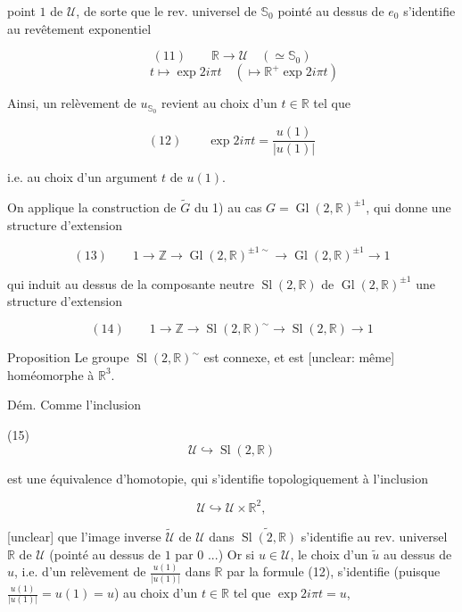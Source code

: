 point $1$ de $\mathcal{U}$, de sorte que le rev. 
universel de $\mathbb{S}_0$ pointé au dessus de 
$e_0$ s'identifie au revêtement exponentiel

$$ (11) \qquad \mathbb{R} \longrightarrow \mathcal{U} \quad (\simeq \mathbb{S}_0) $$
$$ \qquad t \longmapsto \exp 2 i \pi t \quad (\mapsto \mathbb{R}^+ \exp 2 i \pi t) $$

Ainsi, un relèvement de $u_{\mathbb{S}_0}$ revient au 
choix d'un $t \in \mathbb{R}$ tel que

$$ (12) \qquad \exp 2 i \pi t = \frac{u(1)}{|u(1)|} $$

i.e. au choix d'un argument $t$ de $u(1)$.

On applique la construction de $\widetilde{G}$ du 1) au cas $G = \operatorname{Gl}(2, \mathbb{R})^{\pm 1}$, 
qui donne une structure d'extension

$$ (13) \qquad 1 \longrightarrow \mathbb{Z} \longrightarrow \operatorname{Gl}(2, \mathbb{R})^{\pm 1 \sim} \longrightarrow \operatorname{Gl}(2, \mathbb{R})^{\pm 1} \longrightarrow 1 $$

qui induit au dessus de la composante 
neutre $\operatorname{Sl}(2, \mathbb{R})$ de $\operatorname{Gl}(2, \mathbb{R})^{\pm 1}$ une 
structure d'extension

$$ (14) \qquad 1 \longrightarrow \mathbb{Z} \longrightarrow \operatorname{Sl}(2, \mathbb{R})^\sim \longrightarrow \operatorname{Sl}(2, \mathbb{R}) \longrightarrow 1 $$

Proposition Le groupe $\operatorname{Sl}(2, \mathbb{R})^\sim$ est connexe, 
et est [unclear: même] homéomorphe à $\mathbb{R}^3$.

\newpage


Dém. Comme l'inclusion

(15) $$ \mathcal{U} \hookrightarrow \operatorname{Sl}(2, \mathbb{R}) $$

est une équivalence d'homotopie,
qui s'identifie topologiquement à l'inclusion

$$ \mathcal{U} \hookrightarrow \mathcal{U} \times \mathbb{R}^2 , $$

[unclear] que l'image inverse $\tilde{\mathcal{U}}$
de $\mathcal{U}$ dans $\widetilde{\operatorname{Sl}(2, \mathbb{R})}$ s'identifie au
rev. universel $\mathbb{R}$ de $\mathcal{U}$ (pointé
au dessus de $1$ par $0$ ...) Or si
$u \in \mathcal{U}$, le choix d'un $\tilde{u}$ au dessus
de $u$, i.e. d'un relèvement de $\frac{u(1)}{|u(1)|}$
dans $\mathbb{R}$ par la formule (12), s'identifie
(puisque $\frac{u(1)}{|u(1)|} = u(1) = u$) au choix
d'un $t \in \mathbb{R}$ tel que $\exp 2i\pi t = u$,


